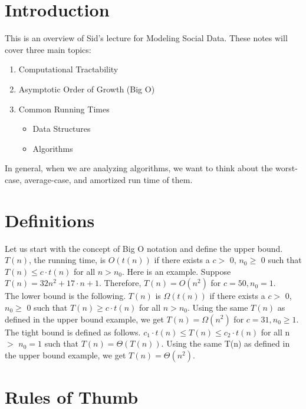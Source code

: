 
\section{Introduction}
This is an overview of Sid's lecture for Modeling Social Data. These notes will cover three main topics:
\begin{enumerate}
  \item Computational Tractability
  \item Asymptotic Order of Growth (Big O)
  \item Common Running Times
  	\begin{itemize}
  		\item Data Structures
  		\item Algorithms
	\end{itemize}
\end{enumerate}

In general, when we are analyzing algorithms, we want to think about the worst-case, average-case, and amortized run time of them.

\section{Definitions}


Let us start with the concept of Big O notation and define the upper bound. $T(n)$, the running time, is $\textit{O}(t(n))$ if there exists a $c >$ 0, $n_{0} \geq$ 0 such that $T(n) \leq c\cdot t(n)$ for all $n > n_{0}$. Here is an example. Suppose $T(n) = 32n^{2} + 17 \cdot n +1$. Therefore, $T(n) = O(n^{2})$ for $ c=50, n_{0} =1$. \\

The lower bound is the following.  $T(n)$ is $\Omega(t(n))$ if there exists a $c >$ 0, $n_{0} \geq$ 0 such that $T(n) \geq c\cdot t(n)$ for all $n > n_{0}$. Using the same $T(n)$ as defined in the upper bound example, we get $T(n) = \Omega(n^{2})$ for $ c=31, n_{0} \geq 1$. \\


The tight bound is defined as follows. $c_{1} \cdot t(n) \leq T(n) \leq c_{2} \cdot t(n)$ for all n $>$ $n_{0} =1$ such that $T(n) = \Theta (T(n))$. Using the same T(n) as defined in the upper bound example, we get $T(n) = \Theta(n^{2})$. \\

\section{Rules of Thumb}

